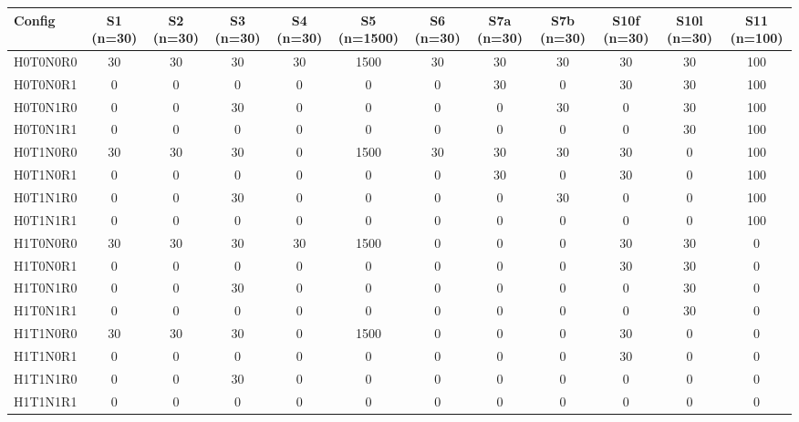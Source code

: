 \begin{table}[t]
\centering
\small
\begin{tabular}{lccccccccccc}
\toprule
Config & S1 (n=30) & S2 (n=30) & S3 (n=30) & S4 (n=30) & S5 (n=1500) & S6 (n=30) & S7a (n=30) & S7b (n=30) & S10f (n=30) & S10l (n=30) & S11 (n=100) \\
\midrule
H0T0N0R0 & 30 & 30 & 30 & 30 & 1500 & 30 & 30 & 30 & 30 & 30 & 100 \\
H0T0N0R1 & 0 & 0 & 0 & 0 & 0 & 0 & 30 & 0 & 30 & 30 & 100 \\
H0T0N1R0 & 0 & 0 & 30 & 0 & 0 & 0 & 0 & 30 & 0 & 30 & 100 \\
H0T0N1R1 & 0 & 0 & 0 & 0 & 0 & 0 & 0 & 0 & 0 & 30 & 100 \\
H0T1N0R0 & 30 & 30 & 30 & 0 & 1500 & 30 & 30 & 30 & 30 & 0 & 100 \\
H0T1N0R1 & 0 & 0 & 0 & 0 & 0 & 0 & 30 & 0 & 30 & 0 & 100 \\
H0T1N1R0 & 0 & 0 & 30 & 0 & 0 & 0 & 0 & 30 & 0 & 0 & 100 \\
H0T1N1R1 & 0 & 0 & 0 & 0 & 0 & 0 & 0 & 0 & 0 & 0 & 100 \\
H1T0N0R0 & 30 & 30 & 30 & 30 & 1500 & 0 & 0 & 0 & 30 & 30 & 0 \\
H1T0N0R1 & 0 & 0 & 0 & 0 & 0 & 0 & 0 & 0 & 30 & 30 & 0 \\
H1T0N1R0 & 0 & 0 & 30 & 0 & 0 & 0 & 0 & 0 & 0 & 30 & 0 \\
H1T0N1R1 & 0 & 0 & 0 & 0 & 0 & 0 & 0 & 0 & 0 & 30 & 0 \\
H1T1N0R0 & 30 & 30 & 30 & 0 & 1500 & 0 & 0 & 0 & 30 & 0 & 0 \\
H1T1N0R1 & 0 & 0 & 0 & 0 & 0 & 0 & 0 & 0 & 30 & 0 & 0 \\
H1T1N1R0 & 0 & 0 & 30 & 0 & 0 & 0 & 0 & 0 & 0 & 0 & 0 \\
H1T1N1R1 & 0 & 0 & 0 & 0 & 0 & 0 & 0 & 0 & 0 & 0 & 0 \\
\bottomrule
\end{tabular}
\end{table}

